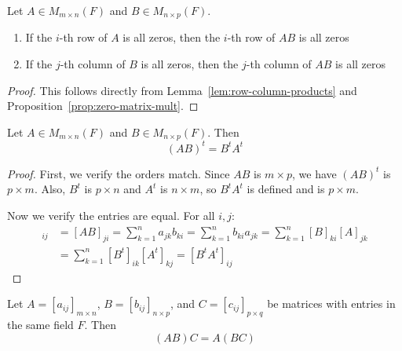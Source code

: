 \begin{proposition}\label{prop:zero-row-column}
    Let $A \in M_{m \times n}(F)$ and $B \in M_{n \times p}(F)$.
    \begin{enumerate}[label=(\roman*)]
        \item If the $i$-th row of $A$ is all zeros, then the $i$-th row of $AB$ is all zeros
        \item If the $j$-th column of $B$ is all zeros, then the $j$-th column of $AB$ is all zeros
    \end{enumerate}
\end{proposition}

\begin{proof}
    This follows directly from Lemma~\ref{lem:row-column-products} and Proposition~\ref{prop:zero-matrix-mult}.
\end{proof}

\begin{proposition}\label{prop:transpose-product}
    Let $A \in M_{m \times n}(F)$ and $B \in M_{n \times p}(F)$. Then
    \[
    (AB)^t = B^t A^t
    \]
\end{proposition}

\begin{proof}
    First, we verify the orders match. Since $AB$ is $m \times p$, we have $(AB)^t$ is $p \times m$. Also, $B^t$ is $p \times n$ and $A^t$ is $n \times m$, so $B^t A^t$ is defined and is $p \times m$.
    
    Now we verify the entries are equal. For all $i,j$:
    \begin{align*}
    [(AB)^t]_{ij} &= [AB]_{ji} = \sum_{k=1}^{n} a_{jk}b_{ki} = \sum_{k=1}^{n} b_{ki}a_{jk} = \sum_{k=1}^{n} [B]_{ki}[A]_{jk} \\
    &= \sum_{k=1}^{n} [B^t]_{ik}[A^t]_{kj} = [B^t A^t]_{ij}
    \end{align*}
\end{proof}

\begin{theorem}\label{thm:matrix-mult-assoc}
    Let $A = [a_{ij}]_{m \times n}$, $B = [b_{ij}]_{n \times p}$, and $C = [c_{ij}]_{p \times q}$ be matrices with entries in the same field $F$. Then
    \[
    (AB)C = A(BC)
    \]
\end{theorem}

